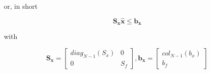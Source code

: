 \noindent
or, in short

\noindent
\begin{equation}
	\mathbf{S_x \hat{x}} \leq \mathbf{b_x}
\end{equation}

\noindent
with

\noindent
\begin{equation}
	\mathbf{S_x} = 
	\left[
		\begin{matrix}
			diag_{N-1}(S_x) & 0 \\
			0 & S_f
		\end{matrix}
	\right], \mathbf{b_x} = 
	\left[
		\begin{matrix}
			col_{N-1}(b_x) \\
			b_f
		\end{matrix}
	\right]
\end{equation}
